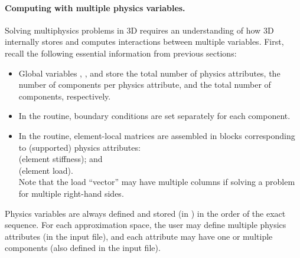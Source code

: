 \paragraph{Computing with multiple physics variables.}

Solving multiphysics problems in \hp3D requires an understanding of how \hp3D internally stores and computes interactions between multiple variables.
First, recall the following essential information from previous sections:
\begin{itemize}
	\item Global variables , , and  store the total number of physics attributes, the number of components per physics attribute, and the total number of components, respectively.
	\item In the  routine, boundary conditions are set separately for each component.
	\item In the  routine, element-local matrices are assembled in blocks corresponding to (supported) physics attributes:\\ 
	 (element stiffness); and \\
	 (element load).\\
	Note that the load ``vector'' may have multiple columns if solving a problem for multiple right-hand sides.
\end{itemize}

Physics variables are always defined and stored (in ) in the order of the exact sequence. For each approximation space, the user may define multiple physics attributes (in the  input file), and each attribute may have one or multiple components (also defined in the  input file).

